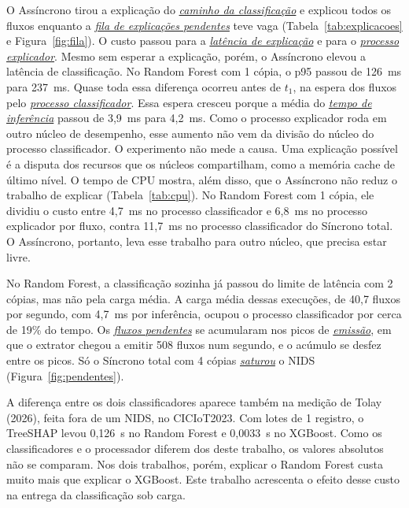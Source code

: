 \documentclass[
  12pt,
  oneside,
  a4paper,
  chapter=TITLE,
  sumario=tradicional,
  english,
  brazil
]{abntex2}
\newcommand{\termo}[2]{\hyperref[gl:#1]{\emph{#2}}}
\begin{document}
O Assíncrono tirou a explicação do \termo{caminho}{caminho da classificação} e explicou todos os
fluxos enquanto a \termo{fila-explicacoes}{fila de explicações pendentes} teve vaga
(Tabela~\ref{tab:explicacoes} e Figura~\ref{fig:fila}). O custo passou para a \termo{latencia-explicacao}{latência de
explicação} e para o \termo{processo-explicador}{processo explicador}. Mesmo sem esperar a
explicação, porém, o Assíncrono elevou a latência de classificação. No Random Forest com 1 cópia, o
p95 passou de 126~ms para 237~ms. Quase toda essa diferença ocorreu antes de $t_1$, na espera dos
fluxos pelo \termo{processo-classificador}{processo classificador}. Essa espera cresceu porque a média do
\termo{tempo-inferencia}{tempo de inferência} passou de 3,9~ms para 4,2~ms. Como o processo
explicador roda em outro núcleo de desempenho, esse aumento não vem da divisão do núcleo do
processo classificador. O experimento não mede a causa. Uma explicação possível é a disputa dos
recursos que os núcleos compartilham, como a memória cache de último nível. O tempo de CPU mostra,
além disso, que o Assíncrono não reduz o trabalho de explicar (Tabela~\ref{tab:cpu}). No Random
Forest com 1 cópia, ele dividiu o custo entre 4,7~ms no processo classificador e 6,8~ms no processo
explicador por fluxo, contra 11,7~ms no processo classificador do Síncrono total. O Assíncrono,
portanto, leva esse trabalho para outro núcleo, que precisa estar livre.

No Random Forest, a classificação sozinha já passou do limite de latência com 2 cópias, mas não pela
carga média. A carga média dessas execuções, de 40,7 fluxos por segundo, com 4,7~ms por inferência,
ocupou o processo classificador por cerca de 19\% do tempo. Os \termo{fluxo-pendente}{fluxos pendentes} se acumularam
nos picos de \termo{emissao}{emissão}, em que o extrator chegou a emitir 508 fluxos num segundo, e o
acúmulo se desfez entre os picos. Só o Síncrono total com 4 cópias \termo{saturacao}{saturou} o NIDS
(Figura~\ref{fig:pendentes}).

A diferença entre os dois classificadores aparece também na medição de Tolay (2026), feita fora de
um NIDS, no CICIoT2023. Com lotes de 1 registro, o TreeSHAP levou 0,126~s no Random Forest e
0,0033~s no XGBoost. Como os classificadores e o processador diferem dos deste trabalho, os valores
absolutos não se comparam. Nos dois trabalhos, porém, explicar o Random Forest custa muito mais que
explicar o XGBoost. Este trabalho acrescenta o efeito desse custo na entrega da classificação sob
carga.
\end{document}
